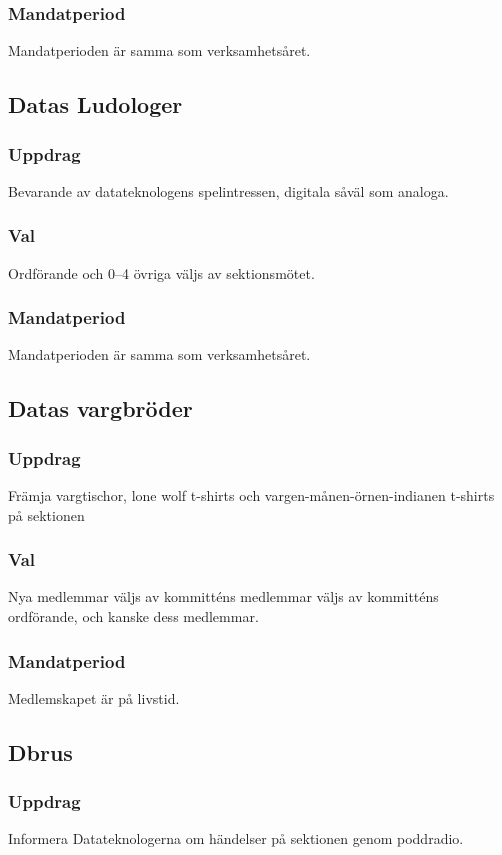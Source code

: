 \subsubsection{Mandatperiod}
Mandatperioden är samma som verksamhetsåret. 

\subsection{Datas Ludologer}
\subsubsection{Uppdrag}
Bevarande av datateknologens spelintressen, digitala såväl som analoga.
\subsubsection{Val}
Ordförande och 0--4 övriga väljs av sektionsmötet.
\subsubsection{Mandatperiod}
Mandatperioden är samma som verksamhetsåret. 

\subsection{Datas vargbröder}
\subsubsection{Uppdrag}
Främja vargtischor, lone wolf t-shirts och vargen-månen-örnen-indianen t-shirts på sektionen 
\subsubsection{Val}
Nya medlemmar väljs av kommitténs medlemmar väljs av kommitténs ordförande, och kanske dess medlemmar.
\subsubsection{Mandatperiod}
Medlemskapet är på livstid.

\subsection{Dbrus}
\subsubsection{Uppdrag}
Informera Datateknologerna om händelser på sektionen genom poddradio.
